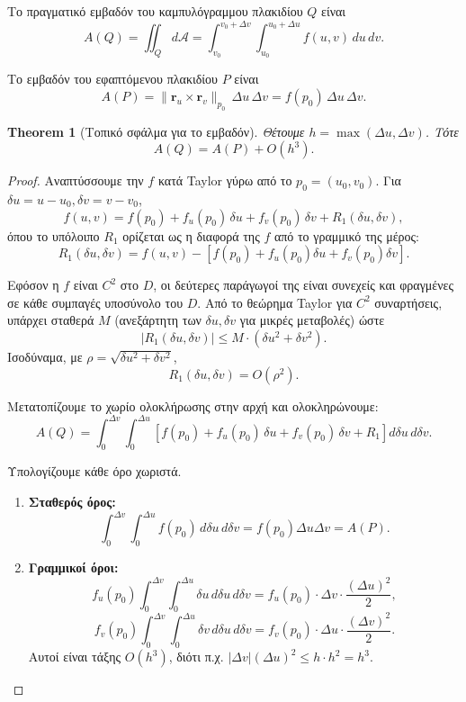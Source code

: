 \documentclass[10pt,a4paper,twoside,openany]{book}
\theoremstyle{plain}
\newtheorem{theorem}{Theorem}[section]
\theoremstyle{definition}
\theoremstyle{remark}
\numberwithin{equation}{section}
\begin{document}
Το πραγματικό εμβαδόν του καμπυλόγραμμου πλακιδίου \(Q\) είναι
\[
A(Q) = \iint_Q d\mathcal{A} = \int_{v_0}^{v_0+\Delta v} \int_{u_0}^{u_0+\Delta u} f(u,v) \, du \, dv.
\]

Το εμβαδόν του εφαπτόμενου πλακιδίου \(P\) είναι
\[
A(P) = \| \mathbf{r}_u \times \mathbf{r}_v \|_{p_0} \, \Delta u \, \Delta v = f(p_0) \, \Delta u \, \Delta v.
\]

\begin{theorem}[Τοπικό σφάλμα για το εμβαδόν]
\label{thm:local_area}
Θέτουμε \(h = \max(\Delta u, \Delta v)\). Τότε
\[
A(Q) = A(P) + O(h^3).
\]
\end{theorem}

\begin{proof}
Αναπτύσσουμε την \(f\) κατά Taylor γύρω από το \(p_0 = (u_0, v_0)\). Για \(\delta u = u - u_0, \delta v = v - v_0\),
\[
f(u,v) = f(p_0) + f_u(p_0)\,\delta u + f_v(p_0)\,\delta v + R_1(\delta u, \delta v),
\]
όπου το υπόλοιπο \(R_1\) ορίζεται ως η διαφορά της \(f\) από το γραμμικό της μέρος:
\[
R_1(\delta u, \delta v) = f(u,v) - \left[ f(p_0) + f_u(p_0)\delta u + f_v(p_0)\delta v \right].
\]

Εφόσον η \(f\) είναι \(C^2\) στο \(D\), οι δεύτερες παράγωγοί της είναι συνεχείς και φραγμένες σε κάθε συμπαγές υποσύνολο του \(D\). Από το θεώρημα Taylor για \(C^2\) συναρτήσεις, υπάρχει σταθερά \(M\) (ανεξάρτητη των \(\delta u, \delta v\) για μικρές μεταβολές) ώστε
\[
|R_1(\delta u, \delta v)| \le M \cdot (\delta u^2 + \delta v^2).
\]
Ισοδύναμα, με \(\rho = \sqrt{\delta u^2 + \delta v^2}\),
\[
R_1(\delta u, \delta v) = O(\rho^2).
\]

Μετατοπίζουμε το χωρίο ολοκλήρωσης στην αρχή και ολοκληρώνουμε:
\[
A(Q) = \int_0^{\Delta v} \int_0^{\Delta u} \left[ f(p_0) + f_u(p_0)\,\delta u + f_v(p_0)\,\delta v + R_1 \right] d\delta u \, d\delta v.
\]

Υπολογίζουμε κάθε όρο χωριστά.

\begin{enumerate}
\item \textbf{Σταθερός όρος:}
\[
\int_0^{\Delta v} \int_0^{\Delta u} f(p_0) \, d\delta u \, d\delta v = f(p_0) \Delta u \Delta v = A(P).
\]

\item \textbf{Γραμμικοί όροι:}
\[
f_u(p_0) \int_0^{\Delta v} \int_0^{\Delta u} \delta u \, d\delta u \, d\delta v = f_u(p_0) \cdot \Delta v \cdot \frac{(\Delta u)^2}{2},
\]
\[
f_v(p_0) \int_0^{\Delta v} \int_0^{\Delta u} \delta v \, d\delta u \, d\delta v = f_v(p_0) \cdot \Delta u \cdot \frac{(\Delta v)^2}{2}.
\]
Αυτοί είναι τάξης \(O(h^3)\), διότι π.χ. \(|\Delta v| (\Delta u)^2 \le h \cdot h^2 = h^3\).


\end{enumerate}
\end{proof}
\end{document}
